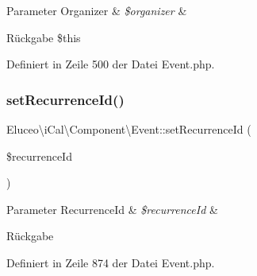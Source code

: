 \begin{DoxyParams}[1]{Parameter}
Organizer & {\em \$organizer} & \\
\hline
\end{DoxyParams}
\begin{DoxyReturn}{Rückgabe}
\$this 
\end{DoxyReturn}


Definiert in Zeile 500 der Datei Event.\+php.

\mbox{\label{class_eluceo_1_1i_cal_1_1_component_1_1_event_a58f917ab89985fa449ad2cff85477d0a}} 
\subsubsection{\texorpdfstring{set\+Recurrence\+Id()}{setRecurrenceId()}\hspace{0.1cm}{\footnotesize\ttfamily [1/3]}}
{\footnotesize\ttfamily Eluceo\textbackslash{}i\+Cal\textbackslash{}\+Component\textbackslash{}\+Event\+::set\+Recurrence\+Id (\begin{DoxyParamCaption}\item[{\mbox{\hyperlink{class_eluceo_1_1i_cal_1_1_property_1_1_event_1_1_recurrence_id}{Recurrence\+Id}}}]{\$recurrence\+Id }\end{DoxyParamCaption})}


\begin{DoxyParams}[1]{Parameter}
Recurrence\+Id & {\em \$recurrence\+Id} & \\
\hline
\end{DoxyParams}
\begin{DoxyReturn}{Rückgabe}

\end{DoxyReturn}


Definiert in Zeile 874 der Datei Event.\+php.

\mbox{\label{class_eluceo_1_1i_cal_1_1_component_1_1_event_a58f917ab89985fa449ad2cff85477d0a}} 
